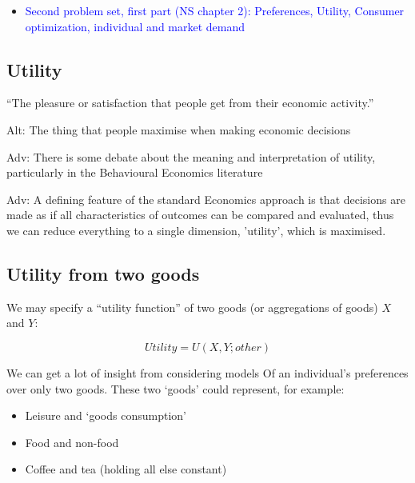 \documentclass[]{article}
\providecommand{\tightlist}{%
  \setlength{\itemsep}{0pt}\setlength{\parskip}{0pt}}
\begin{document}
\begin{itemize}
\tightlist
\item
  \textcolor{blue}{Second problem set, first part (NS chapter 2): Preferences, Utility, Consumer optimization, individual and market demand}
\end{itemize}

\hypertarget{utility}{%
\subsection{Utility}\label{utility}}

\begin{description}
\tightlist
\item[Utility]
``The pleasure or satisfaction that people get from their economic activity.''

Alt: The thing that people maximise when making economic decisions
\end{description}

\textcolor{RawSienna}{Adv: There is some debate about the meaning and interpretation of utility, particularly in the Behavioural Economics literature }

\textcolor{RawSienna}{Adv: A defining feature of the standard Economics approach is that decisions are made as if all characteristics of outcomes can be compared and evaluated, thus we can reduce everything to a single dimension, 'utility', which is maximised.}

\hypertarget{utility-from-two-goods}{%
\subsection{Utility from two goods}\label{utility-from-two-goods}}

We may specify a ``utility function'' of two goods (or aggregations of goods) \(X\) and \(Y\):

\[Utility = U(X,Y; other)\]

We can get a lot of insight from considering models Of an individual's preferences over only two goods. These two `goods' could represent, for example:

\begin{itemize}
\item
  Leisure and `goods consumption'
\item
  Food and non-food
\item
  Coffee and tea (holding all else constant)
\end{itemize}
\end{document}
